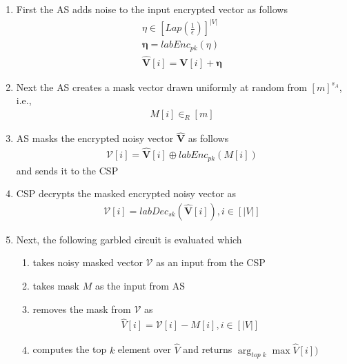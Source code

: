\begin{enumerate}
\begin{enumerate}
\item First the \textsf{AS} adds noise to the input encrypted vector as follows \begin{gather*} \eta \in [Lap(\frac{1}{\epsilon})]^{|V|}\\\boldsymbol{\eta}=labEnc_{pk}(\eta)\\\mathbf{\hat{{V}}}[i]=\mathbf{V}[i]+ \boldsymbol{\eta} \end{gather*} \item Next the \textsf{AS} creates a mask vector drawn uniformly at random from $[m]^{s_A}$, i.e.,  \begin{gather} M[i] \in_R [m]\end{gather} \item \textsf{AS} masks the encrypted noisy vector $\mathbf{\hat{V}}$  as follows \begin{gather}\boldsymbol{\mathcal{V}}[i]= \mathbf{\hat{V}}[i] \oplus labEnc_{pk}(M[i])\end{gather} and sends it to the \textsf{CSP} \item \textsf{CSP} decrypts the masked encrypted noisy vector as \begin{gather*}\mathcal{V}[i]=labDec_{sk}(\mathbf{\hat{V}}[i]), i \in [|V|]\end{gather*} \item Next, the following garbled circuit is evaluated which
    \begin{enumerate}[label=(\alph*)]\item takes noisy masked  vector $\mathcal{V}$ as an input from the \textsf{CSP} \item takes mask $M$ as the input from \textsf{AS}  \item removes the mask from  $\mathcal{V}$  as \begin{gather*} \hat{V}[i]=\mathcal{V}[i]-M[i], i \in [|V|]\end{gather*}  \item computes the top $k$ element over  $\hat{V}$ and returns $\arg_{\textit{top k}}\max{\hat{V}[i])}$
    \end{enumerate} \end{enumerate}\end{enumerate}

